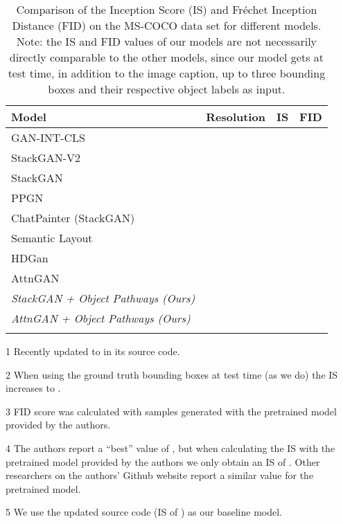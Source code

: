 \documentclass{article} \usepackage{iclr2019_conference,times}
\begin{document}
\begin{table}[t!]\centering
		\renewcommand\thempfootnote{\arabic{mpfootnote}}
		\begin{threeparttable}
			\begin{tabular}{l | c | l | l}
				\toprule
				Model & Resolution & IS  & FID  \\
				\midrule
				GAN-INT-CLS \cite{reed2016generative} &  &  &  \\
				StackGAN-V2 \cite{zhang2017stackgan++} &  &  &  \\
				StackGAN \cite{zhang2017stackgan++} &  & \tnote{1} &  \\
				PPGN \cite{nguyen2016plug} &  &  \\
				ChatPainter (StackGAN) \cite{sharma2018chatpainter} &  &  \\
				Semantic Layout \cite{hong2018inferring} &  & \tnote{2} \\
				HDGan \cite{zhang2018photographic} &  &  & \tnote{3} \\
				AttnGAN \cite{xu2017attngan} &  & \tnote{4} & \tnote{3} \\
				\midrule
				\textit{StackGAN + Object Pathways (Ours)}\tnote{5} &  &  &  \\
				\textit{AttnGAN + Object Pathways (Ours)} &  &  &  \\
				\bottomrule
				\addlinespace[1ex]
			\end{tabular}
			
			\begin{tablenotes}\footnotesize
				\vspace{-0.4em}
				\item[1] Recently updated to  in its source code.
				\item[2] When using the ground truth bounding boxes at test time (as we do) the IS increases to .
				\item[3] FID score was calculated with samples generated with the pretrained model provided by the authors.
				\item[4] The authors report a ``best'' value of , but when calculating the IS with the pretrained model provided by the authors we only obtain an IS of . Other researchers on the authors' Github website report a similar value for the pretrained model.
				\item[5] We use the updated source code (IS of ) as our baseline model.
			\end{tablenotes}
		\end{threeparttable}
		\caption{Comparison of the Inception Score (IS) and Fr\'{e}chet Inception Distance (FID) on the MS-COCO data set for different models.
			Note: the IS and FID values of our models are not necessarily directly comparable to the other models, since our model gets at test time, in addition to the image caption, up to three bounding boxes and their respective object labels as input.}
		\label{tab:mscoco}
	\end{table}
	
\end{document}
